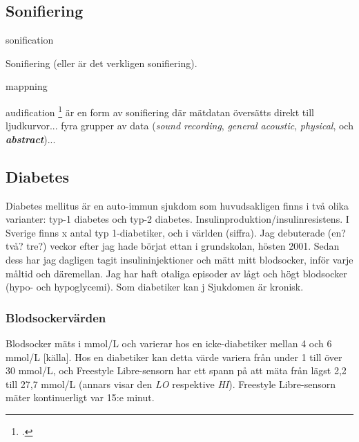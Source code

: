 \documentclass[11pt, a4paper]{article} %
\begin{document}

\subsection*{Sonifiering}

\gls{sonification}


Sonifiering (eller är det verkligen sonifiering). %

\gls{mappning}

\gls{audification} \footcite[302]{noauthor_sonification_2011} är en form av sonifiering där mätdatan översätts direkt till ljudkurvor... fyra grupper av data (\emph{sound recording}, \emph{general acoustic}, \emph{physical}, och \textbf{\emph{abstract}})...

\subsection*{Diabetes}

Diabetes mellitus är en auto-immun sjukdom som huvudsakligen finns i två olika varianter: typ-1 diabetes och typ-2 diabetes. Insulinproduktion/insulinresistens. I Sverige finns x antal typ 1-diabetiker, och i världen (siffra). Jag debuterade (en? två? tre?) veckor efter jag hade börjat ettan i grundskolan, hösten 2001. Sedan dess har jag dagligen tagit insulininjektioner och mätt mitt blodsocker, inför varje måltid och däremellan. Jag har haft otaliga episoder av lågt och högt blodsocker (hypo- och hypoglycemi). Som diabetiker kan j Sjukdomen är kronisk.


\subsubsection*{Blodsockervärden}
Blodsocker mäts i mmol/L och varierar hos en icke-diabetiker mellan 4 och 6 mmol/L [källa]. Hos en diabetiker kan detta värde variera från under 1 till över 30 mmol/L, och Freestyle Libre-sensorn har ett spann på att mäta från lägst 2,2 till 27,7 mmol/L (annars visar den \emph{LO} respektive \emph{HI}). Freestyle Libre-sensorn mäter kontinuerligt var 15:e minut.
\end{document}
